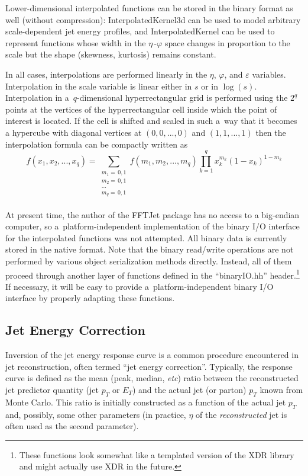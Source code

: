 \documentclass[epsf,12pt,titlepage]{article}
\def\epspace {$\eta$\,-$\varphi$ space }
\newcommand{\cname}[1]{\index{#1}\textsf{#1}}
\begin{document}
Lower-dimensional interpolated functions can be stored in the binary format
as well (without compression): \cname{InterpolatedKernel3d} can
be used to model arbitrary scale-dependent jet energy profiles,
and \cname{InterpolatedKernel} can be used to represent
functions whose width in the \epspace changes in proportion to the scale
but the shape (skewness, kurtosis) remains constant.

In all cases, interpolations are performed linearly in the
$\eta$, $\varphi$, and $\varepsilon$ variables. Interpolation
in the scale variable is linear either in $s$ or in $\log(s)$. 
Interpolation in a~$q$-dimensional hyperrectangular grid is performed
using the $2^q$ points at the vertices of the hyperrectangular
cell inside which the point of interest is located. If the cell
is shifted and scaled in such a~way that it becomes a hypercube
with diagonal vertices at $(0, 0, ..., 0)$ and $(1, 1, ..., 1)$ then
the interpolation formula can be compactly written as
$$
f(x_1, x_2, ..., x_q) = \sum_{\substack{
m_1 = \,0, 1\\
m_2 = \,0, 1\\
...\\
m_q = \,0, 1\\
}}  f(m_1, m_2, ..., m_q) \prod_{k=1}^q x_k^{m_k} (1 - x_k)^{1 - m_k}
$$

At present time, the author of the FFTJet package has no access to a
big-endian computer, so a~platform-independent implementation of the
binary I/O interface for the interpolated functions
was not attempted. All binary data is currently
stored in the native format.
Note that the binary read/write
operations are not performed by various object
serialization methods directly. Instead, all of them proceed through
another layer of functions defined in the ``binaryIO.hh''
header.\footnote{These functions look somewhat like a templated
version of the XDR library and might actually use XDR in the future.}
If necessary, it will be easy to provide a~platform-independent
binary I/O interface by properly adapting these functions.

\subsection{Jet Energy Correction}

Inversion of the jet energy response curve is a common procedure
encountered in jet reconstruction, often termed ``jet energy correction''.
Typically, the response curve is defined as
the mean (peak, median, {\it etc}) ratio between the reconstructed jet
predictor quantity (jet $p_T$ or $E_T$) and the actual jet
(or parton) $p_T$ known from Monte Carlo. This ratio is initially
constructed as a function of the actual jet $p_T$ and, possibly,
some other parameters (in practice, $\eta$ of the {\it reconstructed} jet
is often used as the second parameter).
\end{document}
